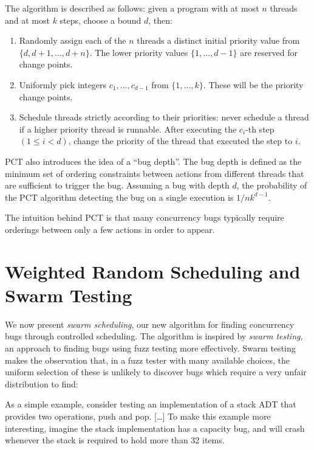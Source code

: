 The algorithm is described as follows\cite{burckhardt2010}: given a program with
at most $n$ threads and at most $k$ steps, choose a bound $d$, then:

\begin{enumerate}
\item Randomly assign each of the $n$ threads a distinct initial priority value
from $\{d, d + 1, \ldots, d+n\}$. The lower priority values $\{1, \ldots, d−1\}$
are reserved for change points.
\item Uniformly pick integers $c_1, \ldots, c_{d−1}$ from $\{1, \ldots,
k\}$. These will be the priority change points.
\item Schedule threads strictly according to their priorities: never
schedule a thread if a higher priority thread is runnable. After executing the
$c_i$-th step $(1 \leq i < d)$, change the priority of the thread that executed
the step to $i$.
\end{enumerate}

PCT also introduces the idea of a ``bug depth''. The bug depth is defined as the
minimum set of ordering constraints between actions from different threads that
are sufficient to trigger the bug\cite{burckhardt2010}. Assuming a bug with
depth $d$, the probability of the PCT algorithm detecting the bug on a single
execution is $1/nk^{d−1}$.

The intuition behind PCT is that many concurrency bugs typically require
orderings between only a few actions in order to appear.

\section{Weighted Random Scheduling and Swarm Testing}
\label{sec:algorithms-swarm}

We now present \emph{swarm scheduling}, our new algorithm for finding
concurrency bugs through controlled scheduling.  The algorithm is inspired
by \emph{swarm testing}\cite{groce2012}, an approach to finding bugs using fuzz
testing more effectively.  Swarm testing makes the observation that, in a fuzz
tester with many available choices, the uniform selection of these is unlikely
to discover bugs which require a very unfair distribution to find:

\begin{displayquote}
  As a simple example, consider testing an implementation of a stack ADT that
  provides two operations, push and pop. [\ldots] To make this example more
  interesting, imagine the stack implementation has a capacity bug, and will
  crash whenever the stack is required to hold more than 32
  items.\cite{groce2012}
\end{displayquote}

